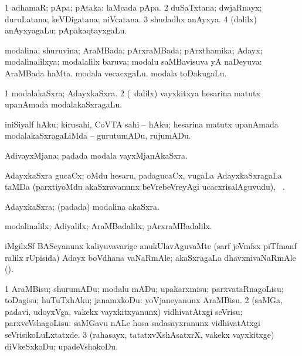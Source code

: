 \bentry
{}
\gl{\nA}
\bmng
\bnum
\num{1} adhamaR; pApa; pAtaka:  laMcada pApa. 
\num{2} duSaTxtana; dwjaRnayx; duruLatana; keVDigatana; niVcatana. 
\num{3} shudadhx anAyxya. 
\num{4} (\bava dalilx) anAyxyagaLu; pApakaqtayxgaLu. 
\enum
\emng
\eentry

\bentry
{}
\gl{\gu}
\bmng
modalina; shuruvina; AraMBada; pArxraMBada; pArxthamika; Adayx; modalinalilxya; modalalilx baruva; modalu saMBavisuva yA naDeyuva:  AraMBada haMta.  modala vecacxgaLu.  modala toDakugaLu. 
\emng
\eentry

\bentry
{}
\gl{\nA}
\bmng
\bnum
\num{1} modalakaSxra; AdayxkaSxra. 
\num{2} (\kanmu\ \bava dalilx) vayxkitxya hesarina matutx upanAmada modalakaSxragaLu. 
\enum
\emng
\eentry

\bentry
{}
\gl{\sakirx}
\bmng
 iniSiyalf hAku; kirusahi, CoVTA sahi -- hAku; hesarina matutx upanAmada modalakaSxragaLiMda -- gurutumADu, rujumADu. 
\emng
\eentry

\bentry
{}
\gl{\nA}
\bmng
AdivayxMjana; padada modala vayxMjanAkaSxra. 
\emng
\eentry

\bentry
{}
\gl{\nA}
\bmng
AdayxkaSxra gucaCx; oMdu hesaru, padagucaCx, \mo vugaLa AdayxkaSxragaLa taMDa (parxtiyoMdu akaSxravanunx beVrebeVreyAgi ucacxrisalAguvudu), \udA\ . 
\emng
\eentry

\bentry
{}
\gl{\nA}
\bmng
AdayxkaSxra; (padada) modalina akaSxra. 
\emng
\eentry

\bentry
{}
\gl{\kirxvi}
\bmng
modalinalilx; Adiyalilx; AraMBadalilx; pArxraMBadalilx. 
\emng
\eentry

\bentry
{}
\gl{\nA}
\bmng
iMgilxSf BASeyanunx kaliyuvavarige anukUlavAguvaMte (sarf jeVmfsx piTfmanf  ralilx rUpisida) Adayx boVdhana vaNaRmAle;  akaSxragaLa dhavxnivaNaRmAle (). 
\emng
\eentry

\bentry
{}
\gl{\sakirx}
\bmng
\bnum
\num{1} AraMBisu; shurumADu; modalu mADu; upakarxmisu; parxvataRnagoLisu; toDagisu; huTuTxhAku; janamxkoDu:  yoVjaneyanunx AraMBisu. 
\num{2} (saMGa, padavi, udoyxVga, \mo vakekx vayxkitxyanunx) vidhivatAtxgi seVrisu; parxveVshagoLisu:  saMGavu nALe hosa sadasayxranunx vidhivatAtxgi seVrisikoLuLxtatxde. 
\num{3} (rahasayx, tatatxvXshAsatxrX, \mo vakekx vayxkitxge) diVkeSxkoDu; upadeVshakoDu. 
\enum
\emng
\eentry

